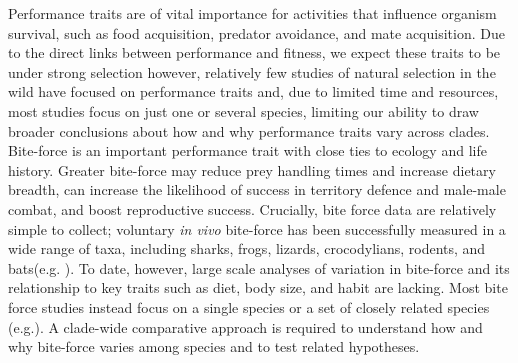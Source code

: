 \documentclass[a4paper, 12pt]{article}
\begin{document}
Performance traits are of vital importance for activities that influence organism survival, such as food acquisition, predator avoidance, and mate acquisition\cite{lailvaux2004performance,legalliard2004,lappin2005weapon,irschick2008}. 
Due to the direct links between performance and fitness, we expect these traits to be under strong selection\cite{arnold1983,irschick2008} however, relatively few studies of natural selection in the wild have focused on performance traits\cite{irschick2008,kingsolver2012} and, due to limited time and resources, most studies focus on just one or several species, limiting our ability to draw broader conclusions about how and why performance traits vary across clades\cite{irschick2008}. 
Bite-force is an important performance trait with close ties to ecology and life history\cite{herrel1999morphology,anderson2008bite,erickson2014comparative,lappin2014reliable,husak2009fitness}. 
Greater bite-force may reduce prey handling times and increase dietary breadth\cite{herrel1999morphology,herrel2004omnivory,verwaijen2002relationships,van2006seed,taverne2020proximate}, can increase the likelihood of success in territory defence and male-male combat\cite{lailvaux2004performance,lappin2005weapon,huyghe2005morphology,husak2006bite}, and boost reproductive success\cite{lappin2005weapon,husak2006bite,husak2009fitness}.
Crucially, bite force data are relatively simple to collect; voluntary \textit{in vivo} bite-force has been successfully measured in a wide range of taxa, including sharks, frogs, lizards, crocodylians, rodents, and bats(e.g. \cite{herrel1999morphology,huber2005analysis,santana2010mechanics,becerra2013biting,erickson2014comparative,lappin2014reliable,lappin2017bite}). 
To date, however, large scale analyses of variation in bite-force and its relationship to key traits such as diet, body size, and habit are lacking. Most bite force studies instead focus on a single species or a set of closely related species (e.g.\cite{taverne2020proximate}).
A clade-wide comparative approach is required to understand how and why bite-force varies among species and to test related hypotheses.
\end{document}
